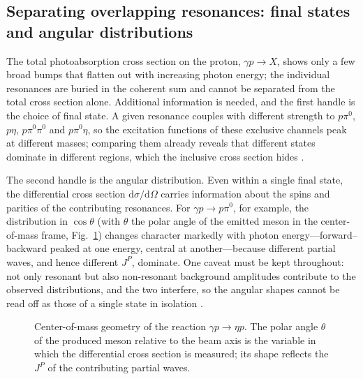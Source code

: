 \FloatBarrier

\subsection{Separating overlapping resonances: final states and angular distributions}
\label{subsec:final-states-angles}

The total photoabsorption cross section on the proton, $\gamma p \to X$, shows only a few
broad bumps that flatten out with increasing photon energy; the individual resonances are
buried in the coherent sum and cannot be separated from the total cross section alone.
Additional information is needed, and the first handle is the choice of final state. A given
resonance couples with different strength to $p\pi^0$, $p\eta$, $p\pi^0\pi^0$ and
$p\pi^0\eta$, so the excitation functions of these exclusive channels peak at different
masses; comparing them already reveals that different states dominate in different regions,
which the inclusive cross section hides \cite[Ch.~15]{Amsler2018}.

The second handle is the angular distribution. Even within a single final state, the
differential cross section $\mathrm{d}\sigma/\mathrm{d}\Omega$ carries information about the
spins and parities of the contributing resonances. For $\gamma p \to p\pi^0$, for example,
the distribution in $\cos\theta$ (with $\theta$ the polar angle of the emitted meson in the
center-of-mass frame, Fig.~\ref{fig:cm-geometry}) changes character markedly with photon
energy---forward--backward peaked at one energy, central at another---because different
partial waves, and hence different $J^{P}$, dominate. One caveat must be kept throughout:
not only resonant but also non-resonant background amplitudes contribute to the observed
distributions, and the two interfere, so the angular shapes cannot be read off as those of
a single state in isolation \cite[Ch.~15]{Amsler2018}.

\begin{figure}[htbp]
    \centering
    \caption{Center-of-mass geometry of the reaction $\gamma p \to \eta p$. The polar angle
    $\theta$ of the produced meson relative to the beam axis is the variable in which the
    differential cross section is measured; its shape reflects the $J^{P}$ of the
    contributing partial waves.}
    \label{fig:cm-geometry}
\end{figure}

